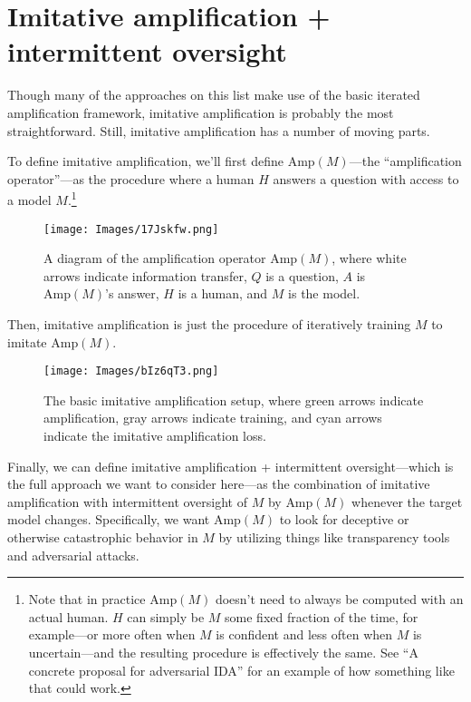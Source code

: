 \documentclass[
  onecolumn,
  natbib,
]{miri-tech-article}
\begin{document}
\section{Imitative amplification + intermittent oversight}
\label{sec:2}

Though many of the approaches on this list make use of the basic iterated amplification\cite{amplification} framework, imitative amplification is probably the most straightforward. Still, imitative amplification has a number of moving parts.

To define imitative amplification, we'll first define $\text{Amp}(M)$---the ``amplification operator''---as the procedure where a human $H$ answers a question with access to a model $M$.\footnote{Note that in practice $\text{Amp}(M)$ doesn't need to always be computed with an actual human. $H$ can simply be $M$ some fixed fraction of the time, for example---or more often when $M$ is confident and less often when $M$ is uncertain---and the resulting procedure is effectively the same. See ``A concrete proposal for adversarial IDA''\cite{adversarial_ida} for an example of how something like that could work.}

\vspace{4mm}

\begin{figure}[H]
  \centering
  \texttt{[image: Images/17Jskfw.png]}
  \caption{A diagram of the amplification operator $\text{Amp}(M)$, where white arrows indicate information transfer, $Q$ is a question, $A$ is $\text{Amp}(M)$'s answer, $H$ is a human, and $M$ is the model.}
\end{figure}

\noindent Then, imitative amplification is just the procedure of iteratively training $M$ to imitate $\text{Amp}(M)$.

\vspace{4mm}

\begin{figure}[H]
  \centering
  \texttt{[image: Images/bIz6qT3.png]}
  \caption{The basic imitative amplification setup, where green arrows indicate amplification, gray arrows indicate training, and cyan arrows indicate the imitative amplification loss.}
\end{figure}

\noindent Finally, we can define imitative amplification + intermittent oversight---which is the full approach we want to consider here---as the combination of imitative amplification with intermittent oversight of $M$ by $\text{Amp}(M)$ whenever the target model changes. Specifically, we want $\text{Amp}(M)$ to look for deceptive or otherwise catastrophic behavior in $M$ by utilizing things like transparency tools and adversarial attacks.
\end{document}
